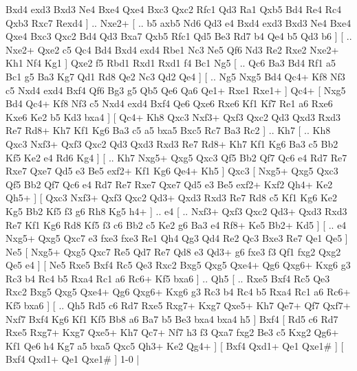 Bxd4 exd3  Bxd3 Ne4  Bxe4 Qxe4  Bxc3 Qxc2  Rfc1 Qd3  Ra1 Qxb5  Bd4 Re4  Rc4 Qxb3  Rxc7 Rexd4   ] .. Nxe2+ [ .. b5  axb5 Nd6  Qd3 e4  Bxd4 exd3  Bxd3 Ne4  Bxe4 Qxe4  Bxc3 Qxc2  Bd4 Qd3  Bxa7 Qxb5  Rfc1 Qd5  Be3 Rd7  b4 Qe4  b5 Qd3  b6   ]  [ .. Nxe2+  Qxe2 c5  Qc4 Bd4  Bxd4 exd4  Rbe1 Nc3  Ne5 Qf6  Nd3 Re2  Rxe2 Nxe2+  Kh1 Nf4  Kg1   ]  Qxe2   f5    Rbd1   Rxd1    Rxd1   f4    Bc1   Ng5 [ .. Qc6  Ba3 Bd4  Rf1 a5  Bc1 g5  Ba3 Kg7  Qd1 Rd8  Qe2 Nc3  Qd2 Qe4   ]  [ .. Ng5  Nxg5 Bd4  Qc4+ Kf8  Nf3 c5  Nxd4 exd4  Bxf4 Qf6  Bg3 g5  Qb5 Qe6  Qa6 Qe1+  Rxe1 Rxe1+   ]  Qc4+ [  Nxg5 Bd4  Qc4+ Kf8  Nf3 c5  Nxd4 exd4  Bxf4 Qe6  Qxe6 Rxe6  Kf1 Kf7  Re1 a6  Rxe6 Kxe6  Ke2 b5  Kd3 bxa4   ]  [  Qc4+ Kh8  Qxc3 Nxf3+  Qxf3 Qxc2  Qd3 Qxd3  Rxd3 Re7  Rd8+ Kh7  Kf1 Kg6  Ba3 c5  a5 bxa5  Bxc5 Rc7  Ba3 Rc2   ] .. Kh7 [ .. Kh8  Qxc3 Nxf3+  Qxf3 Qxc2  Qd3 Qxd3  Rxd3 Re7  Rd8+ Kh7  Kf1 Kg6  Ba3 c5  Bb2 Kf5  Ke2 e4  Rd6 Kg4   ]  [ .. Kh7  Nxg5+ Qxg5  Qxc3 Qf5  Bb2 Qf7  Qc6 e4  Rd7 Re7  Rxe7 Qxe7  Qd5 e3  Be5 exf2+  Kf1 Kg6  Qe4+ Kh5   ]  Qxc3 [  Nxg5+ Qxg5  Qxc3 Qf5  Bb2 Qf7  Qc6 e4  Rd7 Re7  Rxe7 Qxe7  Qd5 e3  Be5 exf2+  Kxf2 Qh4+  Ke2 Qh5+   ]  [  Qxc3 Nxf3+  Qxf3 Qxc2  Qd3+ Qxd3  Rxd3 Re7  Rd8 c5  Kf1 Kg6  Ke2 Kg5  Bb2 Kf5  f3 g6  Rh8 Kg5  h4+   ] .. e4 [ .. Nxf3+  Qxf3 Qxc2  Qd3+ Qxd3  Rxd3 Re7  Kf1 Kg6  Rd8 Kf5  f3 c6  Bb2 c5  Ke2 g6  Ba3 e4  Rf8+ Ke5  Bb2+ Kd5   ]  [ .. e4  Nxg5+ Qxg5  Qxc7 e3  fxe3 fxe3  Re1 Qh4  Qg3 Qd4  Re2 Qc3  Bxe3 Re7  Qe1 Qe5   ]  Ne5 [  Nxg5+ Qxg5  Qxc7 Re5  Qd7 Re7  Qd8 e3  Qd3+ g6  fxe3 f3  Qf1 fxg2  Qxg2 Qe5  e4   ]  [  Ne5 Rxe5  Bxf4 Rc5  Qe3 Rxc2  Bxg5 Qxg5  Qxe4+ Qg6  Qxg6+ Kxg6  g3 Rc3  b4 Rc4  b5 Rxa4  Rc1 a6  Rc6+ Kf5  bxa6   ] .. Qh5 [ .. Rxe5  Bxf4 Rc5  Qe3 Rxc2  Bxg5 Qxg5  Qxe4+ Qg6  Qxg6+ Kxg6  g3 Rc3  b4 Rc4  b5 Rxa4  Rc1 a6  Rc6+ Kf5  bxa6   ]  [ .. Qh5  Rd5 c6  Rd7 Rxe5  Rxg7+ Kxg7  Qxe5+ Kh7  Qe7+ Qf7  Qxf7+ Nxf7  Bxf4 Kg6  Kf1 Kf5  Bb8 a6  Ba7 b5  Be3 bxa4  bxa4 h5   ]  Bxf4 [  Rd5 c6  Rd7 Rxe5  Rxg7+ Kxg7  Qxe5+ Kh7  Qc7+ Nf7  h3 f3  Qxa7 fxg2  Be3 c5  Kxg2 Qg6+  Kf1 Qe6  h4 Kg7  a5 bxa5  Qxc5 Qh3+  Ke2 Qg4+   ]  [  Bxf4 Qxd1+  Qe1 Qxe1#   ]  [  Bxf4 Qxd1+  Qe1 Qxe1#   ] 1-0  |
